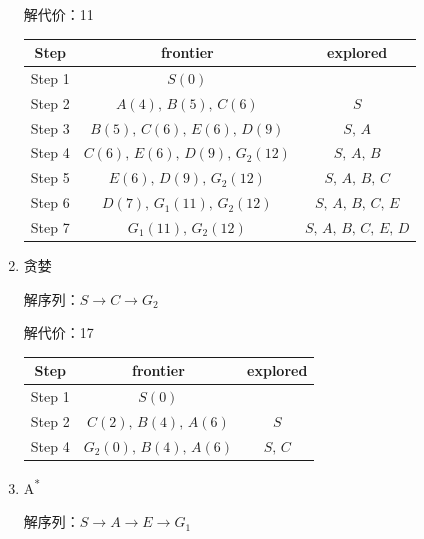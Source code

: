 \begin{example}
\begin{enumerate}
        \textcolor{main1}{解代价：}11
        \begin{table}[htbp]
            \centering
            \begin{tabular}{ccc}
            \toprule[1.5pt]
            Step & frontier & explored \\
            \midrule[1pt]
            Step 1 & $S(0)$ &  \\
            Step 2 & $A(4),\,B(5),\,C(6)$ & $S$ \\
            Step 3 & $B(5),\,C(6),\,E(6),\,D(9)$ & $S,\,A$ \\
            Step 4 & $C(6),\,E(6),\,D(9),\,G_2(12)$ & $S,\,A,\,B$ \\
            Step 5 & $E(6),\,D(9),\,G_2(12)$ & $S,\,A,\,B,\,C$ \\
            Step 6 & $D(7),\,G_1(11),\,G_2(12)$ & $S,\,A,\,B,\,C,\,E$ \\
            Step 7 & $G_1(11),\,G_2(12)$ & $S,\,A,\,B,\,C,\,E,\,D$ \\
            \bottomrule[1.5pt]
            \end{tabular}%
        \end{table}%
        \item 贪婪
                
        \textcolor{main1}{解序列：}$S\to C\to G_2$

        \textcolor{main1}{解代价：}17
        \begin{table}[htbp]
            \centering
            \begin{tabular}{ccc}
            \toprule[1.5pt]
            Step & frontier & explored \\
            \midrule[1pt]
            Step 1 & $S(0)$ &  \\
            Step 2 & $C(2),\,B(4),\,A(6)$ & $S$ \\
            Step 4 & $G_2(0),\,B(4),\,A(6)$ & $S,\,C$ \\
            \bottomrule[1.5pt]
            \end{tabular}%
        \end{table}%
        \item A\textsuperscript{*}
                        
        \textcolor{main1}{解序列：}$S\to A\to E\to G_1$


\end{enumerate}
\end{example}
